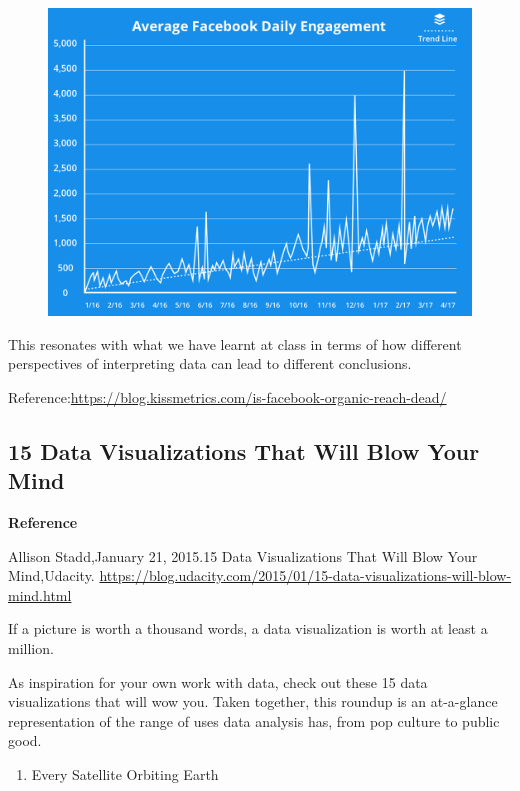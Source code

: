 \documentclass[]{book}
\providecommand{\tightlist}{%
  \setlength{\itemsep}{0pt}\setlength{\parskip}{0pt}}
\theoremstyle{definition}
\theoremstyle{definition}
\theoremstyle{definition}
\theoremstyle{remark}
\begin{document}
\begin{figure}
\centering
\includegraphics{images/average-facebook-daily-reach.png}
\caption{}
\end{figure}

This resonates with what we have learnt at class in terms of how
different perspectives of interpreting data can lead to different
conclusions.

Reference:\url{https://blog.kissmetrics.com/is-facebook-organic-reach-dead/}

\subsection{15 Data Visualizations That Will Blow Your
Mind}\label{data-visualizations-that-will-blow-your-mind}

\textbf{Reference}

Allison Stadd,January 21, 2015.15 Data Visualizations That Will Blow
Your Mind,Udacity.
\url{https://blog.udacity.com/2015/01/15-data-visualizations-will-blow-mind.html}

If a picture is worth a thousand words, a data visualization is worth at
least a million.

As inspiration for your own work with data, check out these 15 data
visualizations that will wow you. Taken together, this roundup is an
at-a-glance representation of the range of uses data analysis has, from
pop culture to public good.

\begin{enumerate}
\def\labelenumi{\arabic{enumi}.}
\tightlist
\item
  Every Satellite Orbiting Earth
\end{enumerate}
\end{document}
